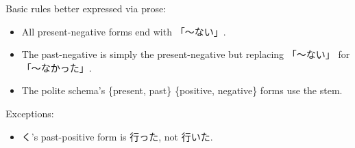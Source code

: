 \documentclass[../nihongo-gakushuu-kyouzai.tex]{subfiles}
\begin{document}
\color{orange}
Basic rules better expressed via prose:
\begin{itemize}
    \item All present-negative forms end with 「〜ない」.
    \item The past-negative is simply the present-negative but replacing 「〜ない」 for 「〜なかった」.
    \item The polite schema's \{present, past\} \times \{positive, negative\} forms use the stem.
\end{itemize}

\color{red}
Exceptions:
\begin{itemize}
    \item {}く's past-positive form is 行った, not 行いた.
\end{itemize}

\color{black}
\end{document}

